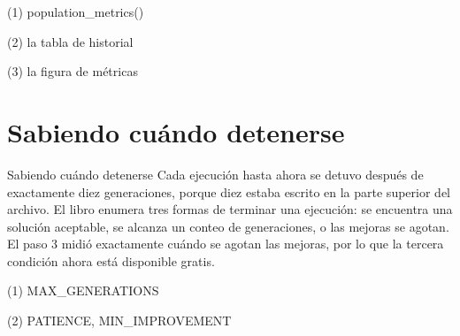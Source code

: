 \begin{frame}[fragile]{(1) population\_metrics()}

\end{frame}

\begin{frame}[fragile]{(2) la tabla de historial}

\end{frame}

\begin{frame}[fragile]{(3) la figura de métricas}

\end{frame}


\section{Sabiendo cuándo detenerse}

\begin{frame}{Sabiendo cuándo detenerse}
Cada ejecución hasta ahora se detuvo después de exactamente diez generaciones, porque
diez estaba escrito en la parte superior del archivo. El libro enumera tres formas de
terminar una ejecución: se encuentra una solución aceptable, se alcanza un conteo de
generaciones, o las mejoras se agotan. El paso 3 midió exactamente cuándo se agotan
las mejoras, por lo que la tercera condición ahora está disponible gratis.
\end{frame}

\begin{frame}[fragile]{(1) MAX\_GENERATIONS}

\end{frame}

\begin{frame}[fragile]{(2) PATIENCE, MIN\_IMPROVEMENT}

\end{frame}

